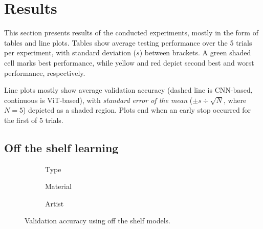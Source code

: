 \section{Results}

This section presents results of the conducted experiments, mostly in the form of tables and line plots. Tables show average testing performance over the 5 trials per experiment, with standard deviation ($s$) between brackets. A green shaded cell marks best performance, while yellow and red depict second best and worst performance, respectively.

Line plots mostly show average validation accuracy (dashed line is CNN-based, continuous is ViT-based), with \textit{standard error of the mean} ($\pm s \div \sqrt{N}$, where $N=5$) depicted as a shaded region. Plots end when an early stop occurred for the first of 5 trials.



\subsection{Off the shelf learning} \label{results:ots}

\begin{figure*}
    \centering
    \begin{subfigure}{0.32\textwidth}
    \def\svgwidth{5.5cm}
    
    \caption{Type}
    \label{results:img:ots_type}
    \end{subfigure}
    \hfill
    \begin{subfigure}{0.32\textwidth}
    \def\svgwidth{5.5cm}
    
    \caption{Material}
    \label{results:img:ots_mat}
    \end{subfigure}
    \hfill
    \begin{subfigure}{0.32\textwidth}
    \def\svgwidth{5.5cm}
    
    \caption{Artist}
    \label{results:img:ots_artist}
    \end{subfigure}
    \caption{Validation accuracy using off the shelf models.}
    \label{results:img:ots}
\end{figure*}

